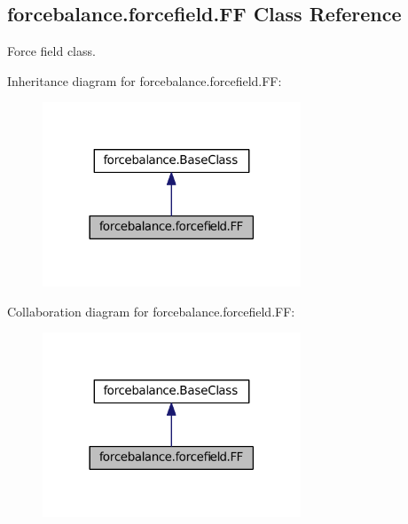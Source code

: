 \hypertarget{classforcebalance_1_1forcefield_1_1FF}{\subsection{forcebalance.\-forcefield.\-F\-F \-Class \-Reference}
\label{classforcebalance_1_1forcefield_1_1FF}
}


\-Force field class.  




\-Inheritance diagram for forcebalance.\-forcefield.\-F\-F\-:\nopagebreak
\begin{figure}[H]
\begin{center}
\leavevmode
\includegraphics[width=218pt]{classforcebalance_1_1forcefield_1_1FF__inherit__graph}
\end{center}
\end{figure}


\-Collaboration diagram for forcebalance.\-forcefield.\-F\-F\-:\nopagebreak
\begin{figure}[H]
\begin{center}
\leavevmode
\includegraphics[width=218pt]{classforcebalance_1_1forcefield_1_1FF__coll__graph}
\end{center}
\end{figure}
